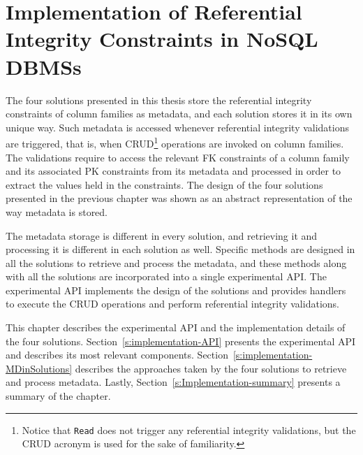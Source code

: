 \chapter{Implementation of Referential Integrity Constraints in NoSQL DBMSs}
\label{c:Implementation}

The four solutions presented in this thesis store  the referential integrity
constraints of column families as metadata, and each solution stores it in its
own unique way. Such metadata is accessed whenever referential integrity
validations are triggered, that is, when \ac{CRUD}\footnote{Notice that
\texttt{Read} does not trigger any referential integrity validations, but the
\ac{CRUD} acronym is used for the sake of familiarity.} operations are invoked
on column families. The validations require to access the relevant  \ac{FK}
constraints of a column family and its associated \ac{PK} constraints from its
metadata and processed in order to extract the values held in the constraints.
The design of the four solutions presented in the previous chapter was shown as
an  abstract representation of the way metadata is stored.

The metadata storage is different in every solution, and retrieving it and
processing it is different in each solution as well. Specific methods are
designed in all the solutions to retrieve and process the metadata, and these
methods along with all the solutions are incorporated into a single experimental
\ac{API}. The experimental \ac{API} implements the design of the solutions and
provides handlers to execute the \ac{CRUD} operations and perform referential
integrity validations.

This chapter describes  the experimental \ac{API}
 and the implementation details of the  four solutions.
Section~\ref{s:implementation-API} presents the experimental \ac{API} and
describes its most relevant components.
Section~\ref{s:implementation-MDinSolutions} describes the approaches taken by
the four solutions to retrieve and process metadata.
Lastly, Section~\ref{s:Implementation-summary} presents a summary of the
chapter.
 

